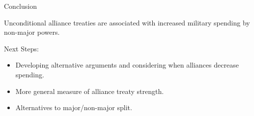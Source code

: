 \documentclass{beamer}
\begin{document}

\begin{frame}{Conclusion}

Unconditional alliance treaties are associated with increased military spending by non-major powers.

\pause

Next Steps:
\pause
\begin{itemize}
\item Developing alternative arguments and considering when alliances decrease spending. 
\pause
\item More general measure of alliance treaty strength. 
\pause
\item Alternatives to major/non-major split. 
\end{itemize}

\end{frame}



\appendix 

\end{document}
